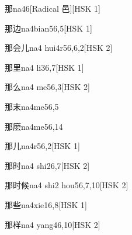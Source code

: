 \begin{entry}{那}{na4}{6}[Radical 邑][HSK 1]
\end{entry}

\begin{entry}{那边}{na4bian5}{6,5}[HSK 1]
\end{entry}

\begin{entry}{那会儿}{na4 hui4r5}{6,6,2}[HSK 2]
\end{entry}

\begin{entry}{那里}{na4 li3}{6,7}[HSK 1]
\end{entry}

\begin{entry}{那么}{na4 me5}{6,3}[HSK 2]
\end{entry}

\begin{entry}{那末}{na4me5}{6,5}
\end{entry}

\begin{entry}{那麽}{na4me5}{6,14}
\end{entry}

\begin{entry}{那儿}{na4r5}{6,2}[HSK 1]
\end{entry}

\begin{entry}{那时}{na4 shi2}{6,7}[HSK 2]
\end{entry}

\begin{entry}{那时候}{na4 shi2 hou5}{6,7,10}[HSK 2]
\end{entry}

\begin{entry}{那些}{na4xie1}{6,8}[HSK 1]
\end{entry}

\begin{entry}{那样}{na4 yang4}{6,10}[HSK 2]
\end{entry}

